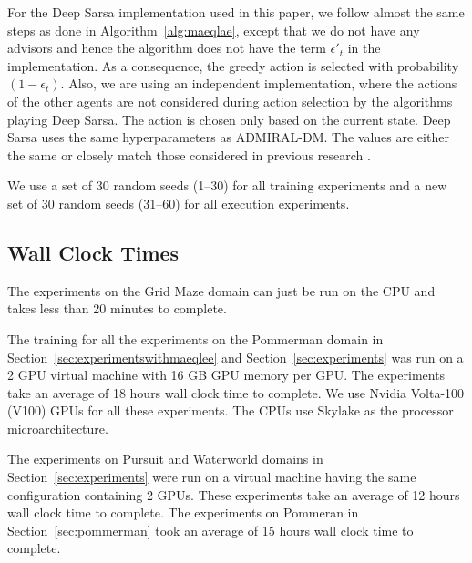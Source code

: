 \documentclass[jair, twoside,11pt,theapa]{article}
\begin{document}
For the Deep Sarsa implementation used in this paper, we follow almost the same steps as done in Algorithm~\ref{alg:maeqlae}, except that we do not have any advisors and hence the algorithm does not have the term $\epsilon'_t$ in the implementation. As a consequence, the greedy action is selected with probability $(1 - \epsilon_t)$. Also, we are using an independent implementation, where the actions of the other agents are not considered during action selection by the algorithms playing Deep Sarsa. The action is chosen only based on the current state. Deep Sarsa uses the same hyperparameters as ADMIRAL-DM. The values are either the same or closely match those considered in previous research \citep{mnih2015human}. 

We use a set of 30 random seeds (1--30) for all training experiments and a new set of 30 random seeds (31--60) for all execution experiments. 

\subsection{Wall Clock Times} 

The experiments on the Grid Maze domain can just be run on the CPU and takes less than 20 minutes to complete. 

The training for all the experiments on the Pommerman domain in Section~\ref{sec:experimentswithmaeqlee} and Section~\ref{sec:experiments} was run on a 2 GPU virtual machine with 16 GB GPU memory per GPU. The experiments take an average of 18 hours wall clock time to complete. We use Nvidia Volta-100 (V100) GPUs for all these experiments. The CPUs use Skylake as the processor microarchitecture. 


The experiments on Pursuit and Waterworld domains in Section~\ref{sec:experiments} were run on a virtual machine having the same configuration containing 2 GPUs. These experiments take an average of 12 hours wall clock time to complete. The experiments on Pommeran in Section~\ref{sec:pommerman} took an average of 15 hours wall clock time to complete. 
 






\end{document}
